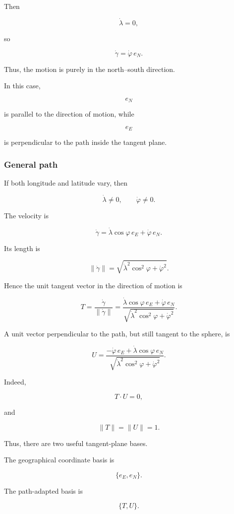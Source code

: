 \documentclass[12pt,a4paper]{article}
\theoremstyle{notespace}
\begin{document}
Then

\[
\dot\lambda=0,
\]

so

\[
\dot\gamma
=
\dot\varphi\,e_N.
\]

Thus, the motion is purely in the north--south direction.

In this case,

\[
e_N
\]

is parallel to the direction of motion, while

\[
e_E
\]

is perpendicular to the path inside the tangent plane.

\subsubsection{General path}

If both longitude and latitude vary, then

\[
\dot\lambda\neq 0,
\qquad
\dot\varphi\neq 0.
\]

The velocity is

\[
\dot\gamma
=
\dot\lambda\cos\varphi\,e_E
+
\dot\varphi\,e_N.
\]

Its length is

\[
\|\dot\gamma\|
=
\sqrt{
	\dot\lambda^2\cos^2\varphi
	+
	\dot\varphi^2
}.
\]

Hence the unit tangent vector in the direction of motion is

\[
\boxed{
	T
	=
	\frac{\dot\gamma}{\|\dot\gamma\|}
	=
	\frac{
		\dot\lambda\cos\varphi\,e_E
		+
		\dot\varphi\,e_N
	}{
		\sqrt{
			\dot\lambda^2\cos^2\varphi
			+
			\dot\varphi^2
		}
	}.
}
\]

A unit vector perpendicular to the path, but still tangent to the sphere,
is

\[
\boxed{
	U
	=
	\frac{
		-\dot\varphi\,e_E
		+
		\dot\lambda\cos\varphi\,e_N
	}{
		\sqrt{
			\dot\lambda^2\cos^2\varphi
			+
			\dot\varphi^2
		}
	}.
}
\]

Indeed,

\[
T\cdot U=0,
\]

and

\[
\|T\|=\|U\|=1.
\]

Thus, there are two useful tangent-plane bases.

The geographical coordinate basis is

\[
\boxed{
	\{e_E,e_N\}.
}
\]

The path-adapted basis is

\[
\boxed{
	\{T,U\}.
}
\]
\end{document}
